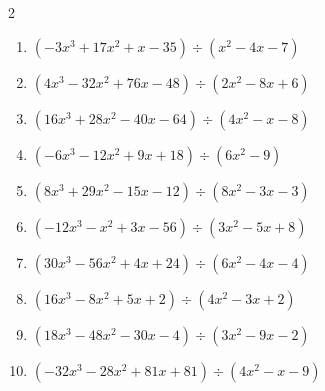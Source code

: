 


\setcounter{quesnum}{10}

\begin{multicols}{2}
\begin{enumerate}
  \itemsep=95pt
  \item $(-3x^{3}+17x^{2}+x-35) \div (x^{2}-4x-7)$

        \phantom{$商 : -3x+5, \quad 剰余 : 2x+9$}

  \item $(4x^{3}-32x^{2}+76x-48) \div (2x^{2}-8x+6)$

        \phantom{$商 : 2x-8, \quad 剰余 : 8x-1$}

  \item $(16x^{3}+28x^{2}-40x-64) \div (4x^{2}-x-8)$

        \phantom{$商 : 4x+8, \quad 剰余 : 4x-2$}

  \item $(-6x^{3}-12x^{2}+9x+18) \div (6x^{2}-9)$

        \phantom{$商 : -x-2, \quad 剰余 : -5x+8$}

  \item $(8x^{3}+29x^{2}-15x-12) \div (8x^{2}-3x-3)$

        \phantom{$商 : x+4, \quad 剰余 : -8x+7$}

\columnbreak %

  \item $(-12x^{3}-x^{2}+3x-56) \div (3x^{2}-5x+8)$

        \phantom{$商 : -4x-7, \quad 剰余 : -4x+2$}

  \item $(30x^{3}-56x^{2}+4x+24) \div (6x^{2}-4x-4)$

        \phantom{$商 : 5x-6, \quad 剰余 : -9x+1$}

  \item $(16x^{3}-8x^{2}+5x+2) \div (4x^{2}-3x+2)$

        \phantom{$商 : 4x+1, \quad 剰余 : x+4$}

  \item $(18x^{3}-48x^{2}-30x-4) \div (3x^{2}-9x-2)$

        \phantom{$商 : 6x+2, \quad 剰余 : -x+1$}

  \item $(-32x^{3}-28x^{2}+81x+81) \div (4x^{2}-x-9)$

        \phantom{$商 : -8x-9, \quad 剰余 : -5x+6$}


\end{enumerate}
\end{multicols}
